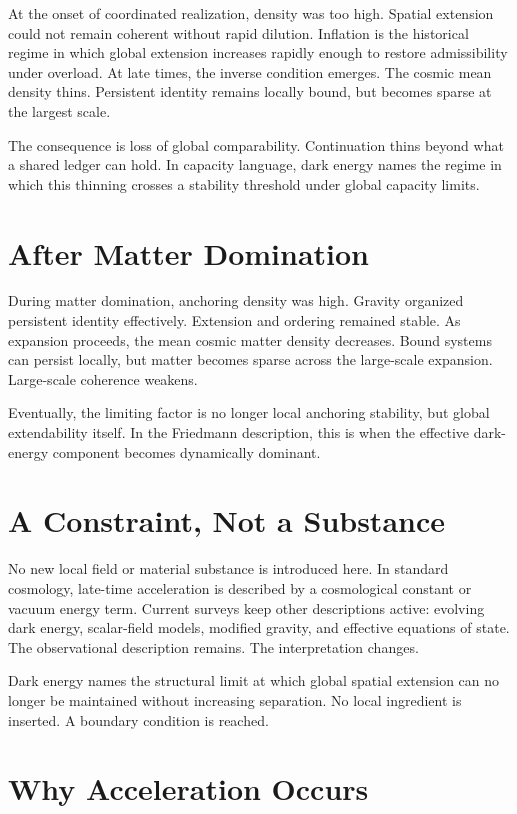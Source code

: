 \documentclass[11pt,twoside,openright]{book}
\begin{document}
At the onset of coordinated realization, density was too high. Spatial extension could not remain coherent without rapid dilution. Inflation is the historical regime in which global extension increases rapidly enough to restore admissibility under overload. At late times, the inverse condition emerges. The cosmic mean density thins. Persistent identity remains locally bound, but becomes sparse at the largest scale.

The consequence is loss of global comparability. Continuation thins beyond what a shared ledger can hold. In capacity language, dark energy names the regime in which this thinning crosses a stability threshold under global capacity limits.

\section*{After Matter Domination}

During matter domination, anchoring density was high. Gravity organized persistent identity effectively. Extension and ordering remained stable. As expansion proceeds, the mean cosmic matter density decreases. Bound systems can persist locally, but matter becomes sparse across the large-scale expansion. Large-scale coherence weakens.

Eventually, the limiting factor is no longer local anchoring stability, but global extendability itself. In the Friedmann description, this is when the effective dark-energy component becomes dynamically dominant.

\section*{A Constraint, Not a Substance}

No new local field or material substance is introduced here. In standard cosmology, late-time acceleration is described by a cosmological constant or vacuum energy term. Current surveys keep other descriptions active: evolving dark energy, scalar-field models, modified gravity, and effective equations of state. The observational description remains. The interpretation changes.

Dark energy names the structural limit at which global spatial extension can no longer be maintained without increasing separation. No local ingredient is inserted. A boundary condition is reached.

\section*{Why Acceleration Occurs}
\end{document}
